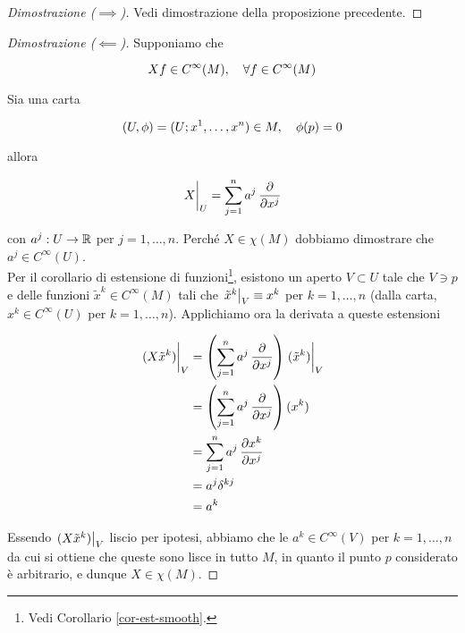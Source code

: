 \begin{proof}[Dimostrazione ($ \implies $)]
	Vedi dimostrazione della proposizione precedente.
\end{proof}

\begin{proof}[Dimostrazione ($ \impliedby $)]
	Supponiamo che
	
	\begin{equation}
		X f \in C^{\infty}(M) \qcomma \forall f \in C^{\infty}(M)
	\end{equation}

	Sia una carta
	
	\begin{equation}
		(U,\phi) = (U; x^{1},\dots,x^{n}) \in M \qcomma \phi(p) = 0
	\end{equation}
	
	allora
	
	\begin{equation}
		\eval{X}_{U} = \sum_{j=1}^{n} a^{j} \, \pdv{x^{j}}
	\end{equation}

	con $ a^{j} : U \to \mathbb{R} $ per $ j=1,\dots,n $. Perché $ X \in \chi(M) $ dobbiamo dimostrare che $ a^{j} \in C^{\infty}(U) $.\\
	Per il corollario di estensione di funzioni\footnote{%
		Vedi Corollario \ref{cor-est-smooth}.%
	}, esistono un aperto $ V \subset U $ tale che $ V \ni p $ e delle funzioni $ \tilde{x}^{k} \in C^{\infty}(M) $ tali che $ \eval{\tilde{x}^{k}}_{V} \equiv x^{k} $ per $ k=1,\dots,n $ (dalla carta, $ x^{k} \in C^{\infty}(U) $ per $ k=1,\dots,n $). Applichiamo ora la derivata a queste estensioni
	
	\begin{align}
		\begin{split}
			\eval{(X \tilde{x}^{k})}_{V} &= \left( \sum_{j=1}^{n} a^{j} \, \pdv{x^{j}} \right) \eval{(\tilde{x}^{k})}_{V} \\
			&= \left( \sum_{j=1}^{n} a^{j} \, \pdv{x^{j}} \right) (x^{k}) \\
			&= \sum_{j=1}^{n} a^{j} \, \pdv{x^{k}}{x^{j}} \\
			&= a^{j} \delta^{kj} \\
			&= a^{k}
		\end{split}
	\end{align}

	Essendo $ \eval{(X \tilde{x}^{k})}_{V} $ liscio per ipotesi, abbiamo che le $ a^{k} \in C^{\infty}(V) $ per $ k=1,\dots,n $ da cui si ottiene che queste sono lisce in tutto $ M $, in quanto il punto $ p $ considerato è arbitrario, e dunque $ X \in \chi(M) $.
\end{proof}

